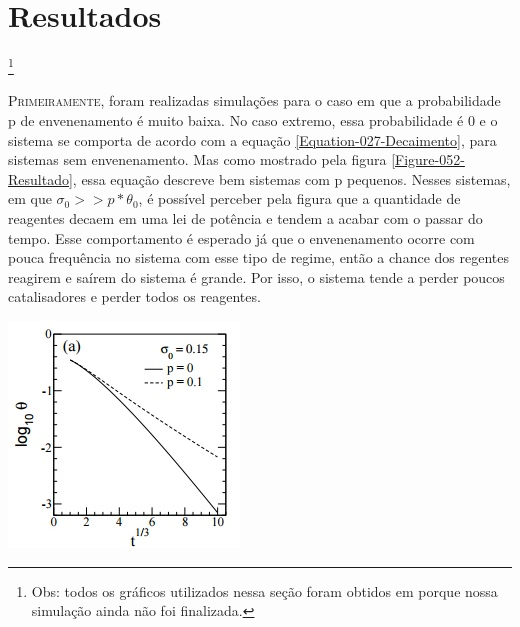 
\section{Resultados}

\footnote{Obs: todos os gráficos utilizados nessa seção foram obtidos em \cite{3} porque nossa simulação ainda não foi finalizada.}

\lettrine{P}{rimeiramente}, foram realizadas simulações para o caso em que a probabilidade p
de envenenamento é muito baixa. No caso extremo, essa probabilidade é 0 e o
sistema se comporta de acordo com a equação \ref{Equation-027-Decaimento}, para
sistemas sem envenenamento. Mas como mostrado pela figura
\ref{Figure-052-Resultado}, essa equação descreve bem sistemas com p pequenos.
Nesses sistemas, em que $\sigma_0 >> p*\theta_0$, é possível perceber pela
figura que a quantidade de reagentes decaem em uma lei de potência e tendem a
acabar com o passar do tempo. Esse comportamento é esperado já que o
envenenamento ocorre com pouca frequência no sistema com esse tipo de regime,
então a chance dos regentes reagirem e saírem do sistema é grande. Por isso, o
sistema tende a perder poucos catalisadores e perder todos os reagentes.

{
	\captionsetup{type=figure}
	\hfill \break
	\includegraphics[width=\columnwidth]{./figures/052-Resultado.jpg}
	\label{Figure-052-Resultado}
}


